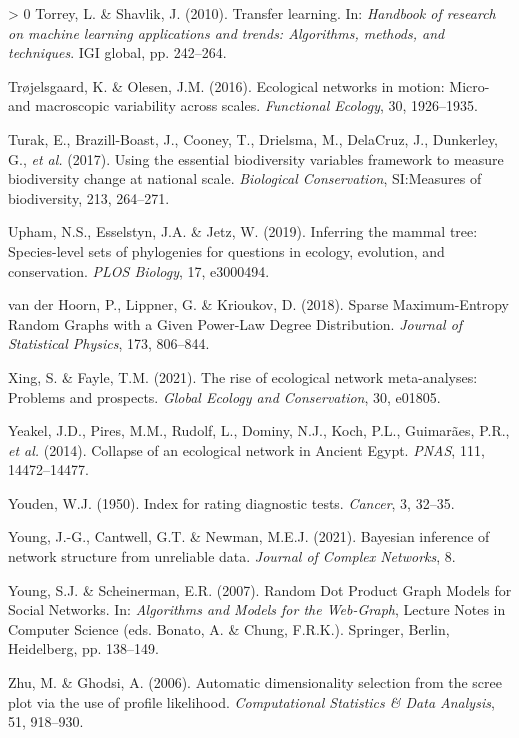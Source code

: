 \documentclass[11pt]{article}
\newlength{\cslhangindent}
\newenvironment{CSLReferences}[3] %
 {%
  \setlength{\parindent}{0pt}
  \ifodd #1 \everypar{\setlength{\hangindent}{\cslhangindent}}\ignorespaces\fi
  \ifnum #2 > 0
  \setlength{\parskip}{#2\baselineskip}
  \fi
 }%
 {}
\begin{document}
\begin{CSLReferences}{1}{0}
\leavevmode\hypertarget{ref-Torrey2010TraLea}{}%
Torrey, L. \& Shavlik, J. (2010). Transfer learning. In: \emph{Handbook
of research on machine learning applications and trends: Algorithms,
methods, and techniques}. IGI global, pp. 242--264.

\leavevmode\hypertarget{ref-Trojelsgaard2016EcoNet}{}%
Trøjelsgaard, K. \& Olesen, J.M. (2016). Ecological networks in motion:
Micro- and macroscopic variability across scales. \emph{Functional
Ecology}, 30, 1926--1935.

\leavevmode\hypertarget{ref-Turak2017UsiEss}{}%
Turak, E., Brazill-Boast, J., Cooney, T., Drielsma, M., DelaCruz, J.,
Dunkerley, G., \emph{et al.} (2017). Using the essential biodiversity
variables framework to measure biodiversity change at national scale.
\emph{Biological Conservation}, SI:Measures of biodiversity, 213,
264--271.

\leavevmode\hypertarget{ref-Upham2019InfMam}{}%
Upham, N.S., Esselstyn, J.A. \& Jetz, W. (2019). Inferring the mammal
tree: Species-level sets of phylogenies for questions in ecology,
evolution, and conservation. \emph{PLOS Biology}, 17, e3000494.

\leavevmode\hypertarget{ref-vanderHoorn2018SpaMax}{}%
van der Hoorn, P., Lippner, G. \& Krioukov, D. (2018). Sparse
Maximum-Entropy Random Graphs with a Given Power-Law Degree
Distribution. \emph{Journal of Statistical Physics}, 173, 806--844.

\leavevmode\hypertarget{ref-Xing2021RisEco}{}%
Xing, S. \& Fayle, T.M. (2021). The rise of ecological network
meta-analyses: Problems and prospects. \emph{Global Ecology and
Conservation}, 30, e01805.

\leavevmode\hypertarget{ref-Yeakel2014ColEco}{}%
Yeakel, J.D., Pires, M.M., Rudolf, L., Dominy, N.J., Koch, P.L.,
Guimarães, P.R., \emph{et al.} (2014). Collapse of an ecological network
in Ancient Egypt. \emph{PNAS}, 111, 14472--14477.

\leavevmode\hypertarget{ref-Youden1950IndRat}{}%
Youden, W.J. (1950). Index for rating diagnostic tests. \emph{Cancer},
3, 32--35.

\leavevmode\hypertarget{ref-Young2021BayInf}{}%
Young, J.-G., Cantwell, G.T. \& Newman, M.E.J. (2021). Bayesian
inference of network structure from unreliable data. \emph{Journal of
Complex Networks}, 8.

\leavevmode\hypertarget{ref-Young2007RanDot}{}%
Young, S.J. \& Scheinerman, E.R. (2007). Random Dot Product Graph Models
for Social Networks. In: \emph{Algorithms and Models for the Web-Graph},
Lecture Notes in Computer Science (eds. Bonato, A. \& Chung, F.R.K.).
Springer, Berlin, Heidelberg, pp. 138--149.

\leavevmode\hypertarget{ref-Zhu2006AutDim}{}%
Zhu, M. \& Ghodsi, A. (2006). Automatic dimensionality selection from
the scree plot via the use of profile likelihood. \emph{Computational
Statistics \& Data Analysis}, 51, 918--930.

\end{CSLReferences}
\end{document}
